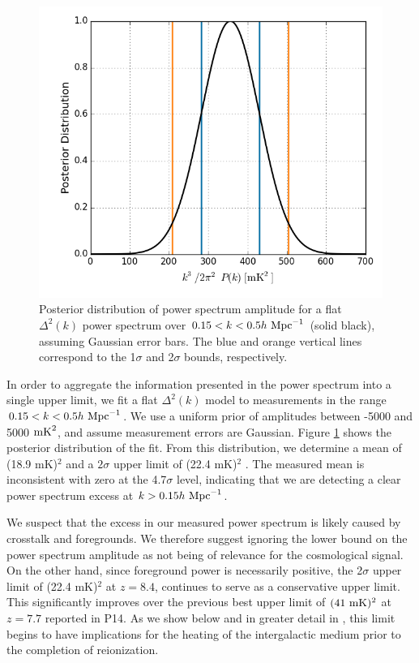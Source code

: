 \documentclass[twocolumn,numberedappendix]{emulateapj} \shorttitle{New Limits on the 21 cm Power Spectrum at $z=8.4$}
\newcommand{\hMpci}{h\ {\rm Mpc}^{-1}}
\newcommand{\mKlimit}{(22.4 mK)$^2$ }
\begin{document}
\begin{figure}\centering
\includegraphics[width=\columnwidth]{plots/flat_k3pk_posterior.png}
\caption{
Posterior distribution of power spectrum amplitude for a flat $\Delta^{2}(k)$
power spectrum over $0.15<k<0.5\hMpci$ (solid black),
assuming Gaussian error bars. The blue and orange
vertical lines correspond to the 1$\sigma$ and 2$\sigma$ bounds, respectively.
}
\label{fig:final_posterior}
\end{figure}

In order to aggregate the information presented in the power spectrum into
a single upper limit, we fit a flat $\Delta^2(k)$ model to measurements
in the range $0.15<k<0.5\hMpci$.  We use a uniform prior of amplitudes between
-5000 and 5000 ${\rm mK}^2$, and assume measurement errors are Gaussian.
Figure \ref{fig:final_posterior} shows the posterior distribution of the fit.
From this distribution, we determine a mean of
(18.9 mK)$^2$ and a $2\sigma$ upper limit of \mKlimit.
The measured mean is inconsistent with zero at the 4.7$\sigma$ level, indicating that
we are detecting a clear power spectrum excess at $k>0.15\hMpci$.

We suspect that the excess in our measured power spectrum is likely caused
by crosstalk and foregrounds.  We therefore suggest ignoring the lower bound on the power spectrum amplitude
as not being of relevance for the cosmological signal.  On the other hand, since foreground
power is necessarily positive, the 
2$\sigma$ upper limit of \mKlimit at $z=8.4$, continues to serve as a conservative upper limit. This significantly improves over the previous
best upper limit of $(41~{\rm mK})^2$ at $z=7.7$ reported in P14.
As we show below and in
greater detail in \citet{pober_et_al2015}, this limit begins to have implications
for the heating of the intergalactic medium prior to the completion of reionization.
\end{document}
